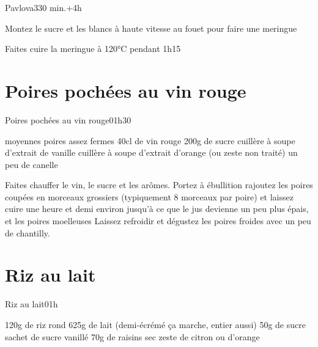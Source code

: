 {\begin{recette}{Pavlova}{3}{30 min.+4h}{}
\begin{preparation}
\etape Montez le sucre et les blancs à haute vitesse au fouet pour faire une meringue
\end{preparation}
\begin{cuisson}
Faites cuire la meringue à 120°C pendant 1h15
\end{cuisson}
\end{recette}

\section{Poires pochées au vin rouge}
\begin{recette}{Poires pochées au vin rouge}{0}{1h30}{}
\begin{ingredients}
 moyennes poires assez fermes
\ingredient 40cl de vin rouge
\ingredient 200g de sucre
 cuillère à soupe d'extrait de vanille
 cuillère à soupe d'extrait d'orange (ou zeste non traité)
\ingredient un peu de canelle
\end{ingredients}

\begin{preparation}
\etape Faites chauffer le vin, le sucre et les arômes. Portez à ébullition
\etape rajoutez les poires coupées en morceaux grossiers (typiquement 8 morceaux par poire) et laissez cuire une heure et demi 
environ jusqu'à ce que le jus devienne un peu plus épais, et les poires moelleuses
\etape Laissez refroidir et dégustez les poires froides avec un peu de chantilly.
\end{preparation}
\end{recette}

\section{Riz au lait}
\begin{recette}{Riz au lait}{0}{1h}{}
\begin{ingredients}[4 pers.]
\ingredient 120g de riz rond
\ingredient 625g de lait (demi-écrémé ça marche, entier aussi)
\ingredient 50g de sucre
 sachet de sucre vanillé
\ingredient 70g de raisins sec
\ingredient zeste de citron ou d'orange
\end{ingredients}


\end{recette}}
